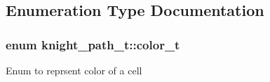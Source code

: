 \subsection{\-Enumeration \-Type \-Documentation}
\hypertarget{namespaceknight__path__t_a0a9ffd13fa55164ea2147a92e4cf1d9d}{
\subsubsection[{color\-\_\-t}]{\setlength{\rightskip}{0pt plus 5cm}enum {\bf knight\-\_\-path\-\_\-t\-::color\-\_\-t}}}\label{namespaceknight__path__t_a0a9ffd13fa55164ea2147a92e4cf1d9d}
\-Enum to reprsent color of a cell 

